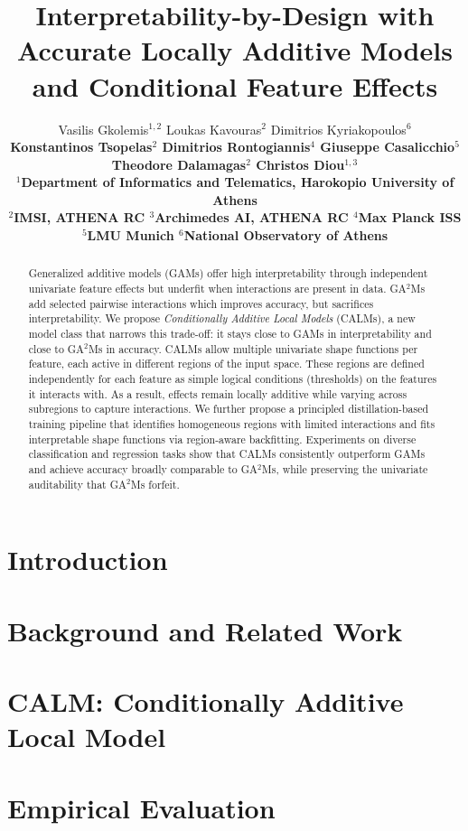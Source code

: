 \documentclass{article}
\title{Interpretability-by-Design with Accurate Locally Additive Models and Conditional Feature Effects}
\author{%
  Vasilis Gkolemis$^{1,2}$ \quad
  Loukas Kavouras$^{2}$ \quad
  Dimitrios Kyriakopoulos$^{6}$ \\
  \bfseries
  Konstantinos Tsopelas$^{2}$ \quad
  Dimitrios Rontogiannis$^{4}$ \quad
  Giuseppe Casalicchio$^{5}$ \\
  \bfseries
  Theodore Dalamagas$^{2}$ \quad
  Christos Diou$^{1,3}$ \\[0.5em]
  $^{1}$Department of Informatics and Telematics, Harokopio University of Athens \\
  $^{2}$IMSI, ATHENA RC \quad
  $^{3}$Archimedes AI, ATHENA RC \quad
  $^{4}$Max Planck ISS \\
  $^{5}$LMU Munich \quad
  $^{6}$National Observatory of Athens
}
\theoremstyle{plain}
\theoremstyle{definition}
\theoremstyle{remark}
\begin{document}
\maketitle

\begin{abstract}
Generalized additive models (GAMs) offer high interpretability through independent univariate feature effects but underfit when interactions are present in data.
GA$^2$Ms add selected pairwise interactions which improves accuracy, but sacrifices interpretability.
We propose \emph{Conditionally Additive Local Models} (CALMs), a new model class that narrows this trade-off: it stays close to GAMs in interpretability and close to GA$^2$Ms in accuracy.
CALMs allow multiple univariate shape functions per feature, each active in different regions of the input space.
These regions are defined independently for each feature as simple logical conditions (thresholds) on the features it interacts with.
As a result, effects remain locally additive while varying across subregions to capture interactions.
We further propose a principled distillation-based training pipeline that identifies homogeneous regions with limited interactions and fits interpretable shape functions via region-aware backfitting.
Experiments on diverse classification and regression tasks show that CALMs consistently outperform GAMs and achieve accuracy broadly comparable to GA$^2$Ms, while preserving the univariate auditability that GA$^2$Ms forfeit.
\end{abstract}

\section{Introduction}
\label{sec:introduction}


\section{Background and Related Work}
\label{sec:related-work}


\section{CALM: Conditionally Additive Local Model}
\label{sec:ram}


\section{Empirical Evaluation}
\label{sec:empirical-evaluation}

\end{document}
